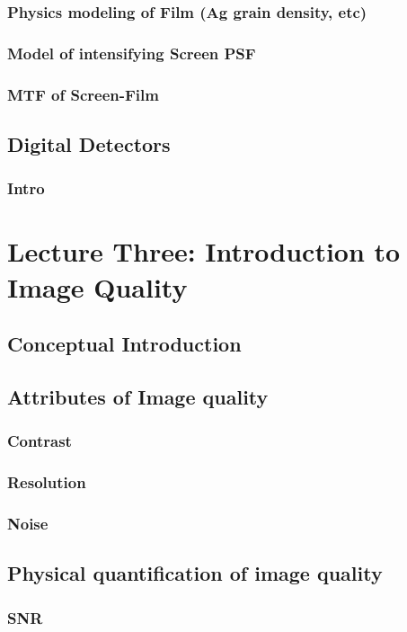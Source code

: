 \documentclass[11pt]{article}
\begin{document}
\subsubsection{Physics modeling of Film (Ag grain density, etc)}
\subsubsection{Model of intensifying Screen PSF}
\subsubsection{MTF of Screen-Film}
\subsection{Digital Detectors}
\subsubsection{Intro}

\newpage
\section{Lecture Three: Introduction to Image Quality}
\subsection{Conceptual Introduction}
\subsection{Attributes of Image quality}
\subsubsection{Contrast}
\subsubsection{Resolution}
\subsubsection{Noise}
\subsection{Physical quantification of image quality}
\subsubsection{SNR}
\end{document}
